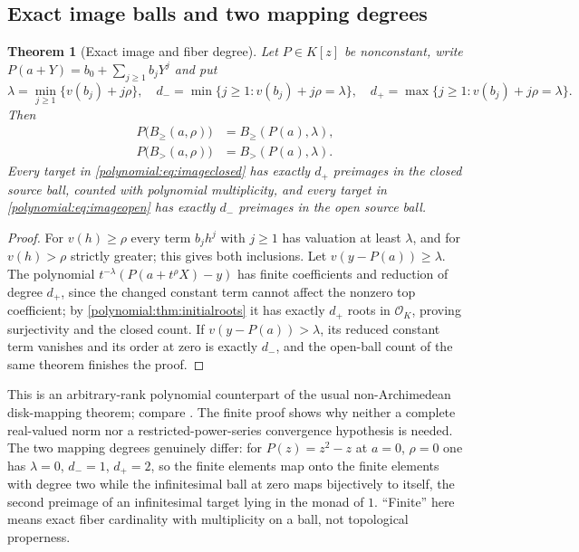\documentclass[11pt,letterpaper]{article}
\numberwithin{equation}{section}
\newtheorem{theorem}{Theorem}[section]
\theoremstyle{definition}
\theoremstyle{remark}\newtheorem{remark}[theorem]{Remark}
\newcommand{\OO}{\mathcal O}
\newcommand{\Bge}[2]{B_{\ge}(#1,#2)}
\newcommand{\Bgt}[2]{B_{>}(#1,#2)}
\begin{document}
\subsection{Exact image balls and two mapping degrees}
\begin{theorem}[Exact image and fiber degree]\label{polynomial:thm:imageballs}
Let $P\in K[z]$ be nonconstant, write $P(a+Y)=b_0+\sum_{j\ge1}b_jY^j$ and put
\[
 \lambda=\min_{j\ge1}\{v(b_j)+j\rho\},\quad
 d_-=\min\{j\ge1:v(b_j)+j\rho=\lambda\},\quad
 d_+=\max\{j\ge1:v(b_j)+j\rho=\lambda\}.
\]
Then
\begin{align}
 P\bigl(\Bge a\rho\bigr)&=\Bge{P(a)}{\lambda},
 \label{polynomial:eq:imageclosed}\\
 P\bigl(\Bgt a\rho\bigr)&=\Bgt{P(a)}{\lambda}.
 \label{polynomial:eq:imageopen}
\end{align}
Every target in \eqref{polynomial:eq:imageclosed} has exactly $d_+$ preimages
in the closed source ball, counted with polynomial multiplicity, and every
target in \eqref{polynomial:eq:imageopen} has exactly $d_-$ preimages in the
open source ball.
\end{theorem}
\begin{proof}
For $v(h)\ge\rho$ every term $b_jh^j$ with $j\ge1$ has valuation at least
$\lambda$, and for $v(h)>\rho$ strictly greater; this gives both inclusions.
Let $v(y-P(a))\ge\lambda$. The polynomial $t^{-\lambda}(P(a+t^\rho X)-y)$ has
finite coefficients and reduction of degree $d_+$, since the changed constant
term cannot affect the nonzero top coefficient; by
\cref{polynomial:thm:initialroots} it has exactly $d_+$ roots in $\OO_K$,
proving surjectivity and the closed count. If $v(y-P(a))>\lambda$, its reduced
constant term vanishes and its order at zero is exactly $d_-$, and the
open-ball count of the same theorem finishes the proof.
\end{proof}

This is an arbitrary-rank polynomial counterpart of the usual
non-Archimedean disk-mapping theorem; compare
\cite[Corollary~3.11]{polynomial:Benedetto}. The finite proof shows why
neither a complete real-valued norm nor a restricted-power-series convergence
hypothesis is needed. The two mapping degrees genuinely differ: for
$P(z)=z^2-z$ at $a=0$, $\rho=0$ one has $\lambda=0$, $d_-=1$, $d_+=2$, so the
finite elements map onto the finite elements with degree two while the
infinitesimal ball at zero maps bijectively to itself, the second preimage of
an infinitesimal target lying in the monad of $1$. ``Finite'' here means exact
fiber cardinality with multiplicity on a ball, not topological properness.
\end{document}
